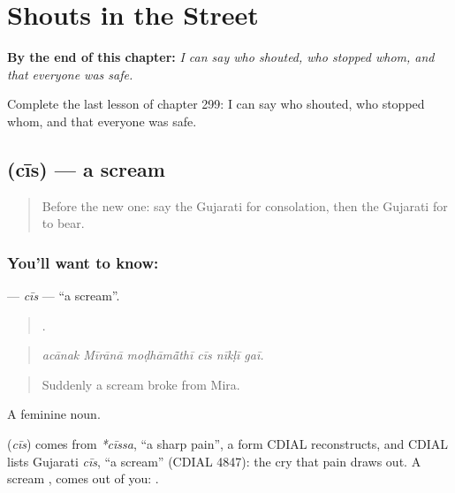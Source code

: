 
\chapter{Shouts in the Street}
\label{ch:gu-shouts-in-the-street}

\begin{chapteropening}
\textbf{By the end of this chapter:} \emph{I can say who shouted, who stopped whom, and that everyone was safe.}

Complete the last lesson of chapter 299: I can say who shouted, who stopped whom, and that everyone was safe.
\end{chapteropening}

\section[\texorpdfstring{\gu{ચીસ} (cīs)}{ચીસ (cīs)}]{ (cīs) — a scream}

\label{lesson:GU-C299-cis}



\begin{quote}
Before the new one: say the Gujarati for consolation, then the Gujarati for to bear.
\end{quote}

\subsection*{You'll want to know: }
\textbf{} — \emph{cīs} — \textquotedblleft{}a scream\textquotedblright{}.

\begin{quote}
     .
\end{quote}

\begin{quote}
\emph{acānak Mīrānā moḍhāmā̃thī cīs nīkḷī gaī.}
\end{quote}

\begin{quote}
Suddenly a scream broke from Mira.
\end{quote}

A feminine noun.

\begin{cousinweb}
\textbf{} (\emph{cīs}) comes from \emph{*cīssa}, \textquotedblleft{}a sharp pain\textquotedblright{}, a form CDIAL reconstructs, and CDIAL lists Gujarati \emph{cīs}, \textquotedblleft{}a scream\textquotedblright{} (CDIAL 4847): the cry that pain draws out. A scream \textbf{ }, comes out of you: \textbf{  }.
\end{cousinweb}


